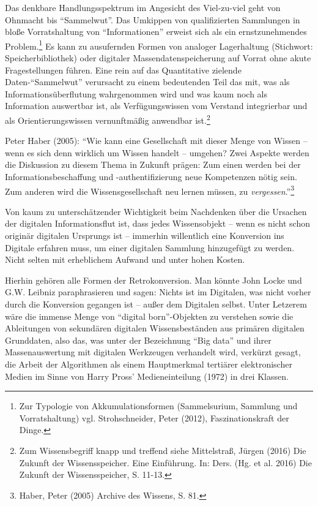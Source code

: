 \documentclass[a4paper,
fontsize=11pt,
oneside,
numbers=noperiodatend,
parskip=half-,
bibliography=totoc,
final
]{scrartcl}
\begin{document}
Das denkbare Handlungsspektrum im Angesicht des Viel-zu-viel geht von
Ohnmacht bis \enquote{Sammelwut}. Das Umkippen von qualifizierten
Sammlungen in bloße Vorratshaltung von \enquote{Informationen} erweist
sich als ein ernstzunehmendes Problem.\footnote{Zur Typologie von
  Akkumulationsformen (Sammelsurium, Sammlung und Vorratshaltung) vgl.
  Strohschneider, Peter (2012), Faszinationskraft der Dinge.} Es kann zu
ausufernden Formen von analoger Lagerhaltung (Stichwort:
Speicherbibliothek) oder digitaler Massendatenspeicherung auf Vorrat
ohne akute Fragestellungen führen. Eine rein auf das Quantitative
zielende Daten-\enquote{Sammelwut} verursacht zu einem bedeutenden Teil
das mit, was als Informationsüberflutung wahrgenommen wird und was kaum
noch als Information auswertbar ist, als Verfügungswissen vom Verstand
integrierbar und als Orientierungswissen vernunftmäßig anwendbar
ist.\footnote{Zum Wissensbegriff knapp und treffend siehe Mittelstraß,
  Jürgen (2016) Die Zukunft der Wissensspeicher. Eine Einführung. In:
  Ders. (Hg. et al. 2016) Die Zukunft der Wissensspeicher, S. 11-13.}

Peter Haber (2005): \enquote{Wie kann eine Gesellschaft mit dieser Menge
von Wissen -- wenn es sich denn wirklich um Wissen handelt -- umgehen?
Zwei Aspekte werden die Diskussion zu diesem Thema in Zukunft prägen:
Zum einen werden bei der Informationsbeschaffung und -authentifizierung
neue Kompetenzen nötig sein. Zum anderen wird die Wissensgesellschaft
neu lernen müssen, zu \emph{vergessen}.}\footnote{Haber, Peter (2005)
  Archive des Wissens, S. 81.}

Von kaum zu unterschätzender Wichtigkeit beim Nachdenken über die
Ursachen der digitalen Informationsflut ist, dass jedes Wissensobjekt --
wenn es nicht schon originär digitalen Ursprungs ist -- immerhin
willentlich eine Konversion ins Digitale erfahren muss, um einer
digitalen Sammlung hinzugefügt zu werden. Nicht selten mit erheblichem
Aufwand und unter hohen Kosten.

Hierhin gehören alle Formen der Retrokonversion. Man könnte John Locke
und G.W. Leibniz paraphrasieren und sagen: Nichts ist im Digitalen, was
nicht vorher durch die Konversion gegangen ist -- außer dem Digitalen
selbst. Unter Letzerem wäre die immense Menge von \enquote{digital
born}-Objekten zu verstehen sowie die Ableitungen von sekundären
digitalen Wissensbeständen aus primären digitalen Grunddaten, also das,
was unter der Bezeichnung \enquote{Big data} und ihrer Massenauswertung
mit digitalen Werkzeugen verhandelt wird, verkürzt gesagt, die Arbeit
der Algorithmen als einem Hauptmerkmal tertiärer elektronischer Medien
im Sinne von Harry Pross' Medieneinteilung (1972) in drei Klassen.
\end{document}
